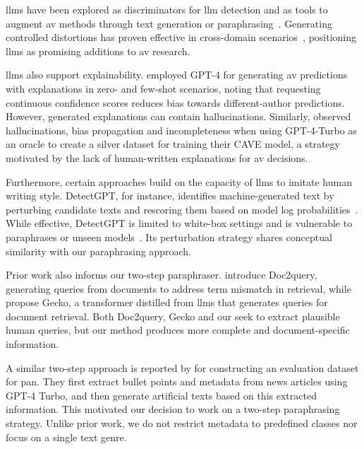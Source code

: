\acp{llm} have been explored as discriminators for \ac{llm} detection \citep{futrzynski_pairwise_2021} and as tools to augment \ac{av} methods through text generation or paraphrasing~\citep{mao_raidar_2024,baradia_mirror_2025}. 
Generating controlled distortions has proven effective in cross-domain scenarios~\citep{bischoff_importance_2020}, positioning \acp{llm} as promising additions to \ac{av} research.

\acp{llm} also support explainability. 
\citet{hung_xai_av_llm_2023} employed GPT-4 for generating \ac{av} predictions with explanations in zero- and few-shot scenarios, noting that requesting continuous confidence scores reduces bias towards different-author predictions. 
However, generated explanations can contain hallucinations. 
Similarly, \citet{ramnath_cave_xai_llm_2025} observed hallucinations, bias propagation and incompleteness when using GPT-4-Turbo as an oracle to create a silver dataset for training their CAVE model, a strategy motivated by the lack of human-written explanations for \ac{av} decisions.

Furthermore, certain approaches build on the capacity of \acp{llm} to imitate human writing style.
DetectGPT, for instance, identifies machine-generated text by perturbing candidate texts and rescoring them based on model log probabilities~\citep{mitchell_detectgpt_2023}. 
While effective, DetectGPT is limited to white-box settings and is vulnerable to paraphrases or unseen models~\citep{Wu_ODD_challenges_2025}. 
Its perturbation strategy shares conceptual similarity with our paraphrasing approach.

Prior work also informs our two-step paraphraser. 
\citet{nogueira_doc2query_2019} introduce Doc2query, generating queries from documents to address term mismatch in retrieval, while \citet{lee_gecko_2024} propose Gecko, a transformer distilled from \acp{llm} that generates queries for document retrieval. 
Both Doc2query, Gecko and our \pextractor{} seek to extract plausible human queries, but our method produces more complete and document-specific information.

A similar two-step approach is reported by \citet{bevendorff_overview_2024} for constructing an evaluation dataset for \acs{pan}.
They first extract bullet points and metadata from news articles using GPT-4 Turbo, and then generate artificial texts based on this extracted information. 
This motivated our decision to work on a two-step paraphrasing strategy. 
Unlike prior work, we do not restrict metadata to predefined classes nor focus on a single text genre.

